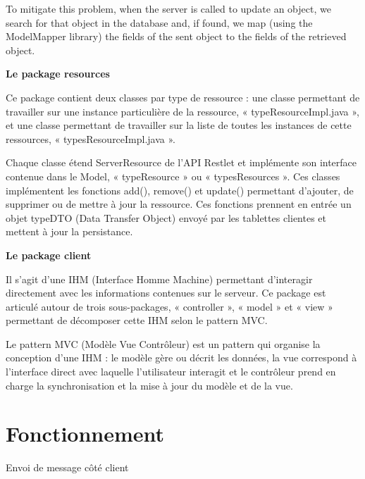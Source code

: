 \documentclass{article}
\begin{document}
\vspace{13pt}
{\color{color01} To mitigate this problem, when the server is called to update 
an object, we search for that object in the database and, if found, we map (using 
the ModelMapper library) the fields of the sent object to the fields of the retrieved 
object.}

\vspace{13pt}
{\color{color01} \textbf{Le package resources}}

{\color{color01} Ce package contient deux classes par type de ressource : une classe 
permettant de travailler sur une instance particulière de la ressource, « typeResourceImpl.java 
», et une classe permettant de travailler sur la liste de toutes les instances 
de cette ressources, « typesResourceImpl.java ».}

{\color{color01} Chaque classe étend ServerResource de l'API Restlet et implémente 
son interface contenue dans le Model, « typeResource » ou « typesResources ». 
Ces classes implémentent les fonctions add(), remove() et update() permettant 
d'ajouter, de supprimer ou de mettre à jour la ressource. Ces fonctions prennent 
en entrée un objet typeDTO (Data Transfer Object) envoyé par les tablettes clientes 
et mettent à jour la persistance.}

\vspace{13pt}
{\color{color01} \textbf{Le package client}}

{\color{color01} Il s'agit d'une IHM (Interface Homme Machine) permettant d'interagir 
directement avec les informations contenues sur le serveur. Ce package est articulé 
autour de trois sous-packages, « controller », « model » et « view » permettant 
de décomposer cette IHM selon le pattern MVC.}

{\color{color01} Le pattern MVC (Modèle Vue Contrôleur) est un pattern qui organise 
la conception d'une IHM : le modèle gère ou décrit les données, la vue correspond 
à l'interface direct avec laquelle l'utilisateur interagit et le contrôleur prend 
en charge la synchronisation et la mise à jour du modèle et de la vue.\label{h.rnrsbrh8lwmq}}

\vspace{37pt}
\section*{{\LARGE {\color{color01} \textbf{Fonctionnement}}}}

{\color{color01} Envoi de message côté client}
\end{document}

